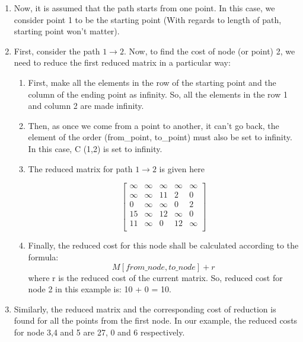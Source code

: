 \documentclass{article}
\begin{document}
\begin{enumerate}
    \item Now, it is assumed that the path starts from one point. In
this case, we consider point 1 to be the starting point
(With regards to length of path, starting point won’t
matter).

    \item First, consider the path $1 \rightarrow 2$. Now, to find the cost of
node (or point) 2, we need to reduce the first reduced
matrix in a particular way:

    \begin{enumerate}

        \item First, make all the elements in the row of the
starting point and the column of the ending
point as infinity. So, all the elements in the row
1 and column 2 are made infinity.

        \item Then, as once we come from a point to another,
it can’t go back, the element of the order
(from\_point, to\_point) must also be set to
infinity. In this case, C (1,2) is set to infinity.

        \item The reduced matrix for path $1 \rightarrow 2$ is given here

        $$
        \left[ {\begin{array}{ccccc}
             \infty & \infty & \infty & \infty & \infty\\
             \infty & \infty & 11 & 2 & 0\\
             0 & \infty & \infty & 0 & 2\\
             15 & \infty & 12 & \infty & 0\\
             11 & \infty & 0 & 12 & \infty\\
        \end{array} }
        \right]
        $$


        \item Finally, the reduced cost for this node shall be
calculated according to the formula:
        $$M[ from\_node, to\_node] + r$$
where r is the
reduced cost of the current matrix.
So, reduced cost for node 2 in this example is:
10 + 0 = 10.

    \end{enumerate}

    \item Similarly, the reduced matrix and the corresponding
cost of reduction is found for all the points from the
first node. In our example, the reduced costs for node
3,4 and 5 are 27, 0 and 6 respectively.


\end{enumerate}
\end{document}
